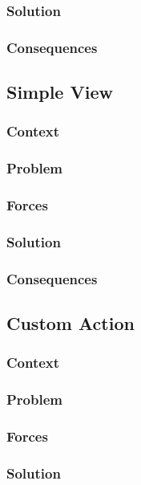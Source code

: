 \documentclass[sigconf]{acmart}
\begin{document}
\subsubsection*{Solution}
\subsubsection*{Consequences}



\subsection{Simple View}
\subsubsection*{Context}
\subsubsection*{Problem}
\subsubsection*{Forces}
\subsubsection*{Solution}
\subsubsection*{Consequences}



\subsection{Custom Action}
\subsubsection*{Context}
\subsubsection*{Problem}
\subsubsection*{Forces}
\subsubsection*{Solution}
\end{document}
